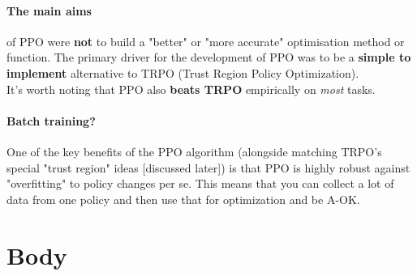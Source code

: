 \documentclass{article}
\begin{document}
\paragraph{The main aims} of PPO were \textbf{not} to build a "better" or "more accurate" optimisation method or function. The primary driver for the development of PPO was to be a \textbf{simple to implement} alternative to TRPO (Trust Region Policy Optimization). \\ 
It's worth noting that PPO also \textbf{beats TRPO} empirically on \emph{most} tasks. 

\paragraph{Batch training?} One of the key benefits of the PPO algorithm (alongside matching TRPO's special "trust region" ideas [discussed later]) is that PPO is highly robust against "overfitting" to policy changes per se.  This means that you can collect a lot of data from one policy and then use that for optimization and be A-OK. 

\section{Body}
\end{document}
